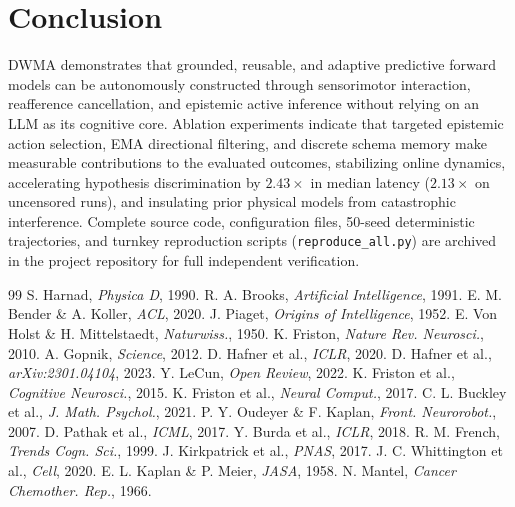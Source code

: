 \documentclass[10pt,twocolumn,a4paper]{article}
\begin{document}
\section{Conclusion}
DWMA demonstrates that grounded, reusable, and adaptive predictive forward models can be autonomously constructed through sensorimotor interaction, reafference cancellation, and epistemic active inference without relying on an LLM as its cognitive core. Ablation experiments indicate that targeted epistemic action selection, EMA directional filtering, and discrete schema memory make measurable contributions to the evaluated outcomes, stabilizing online dynamics, accelerating hypothesis discrimination by $2.43\times$ in median latency ($2.13\times$ on uncensored runs), and insulating prior physical models from catastrophic interference. Complete source code, configuration files, 50-seed deterministic trajectories, and turnkey reproduction scripts (\texttt{reproduce\_all.py}) are archived in the project repository for full independent verification.

\begin{thebibliography}{99}
\scriptsize
{} S. Harnad, \textit{Physica D}, 1990.
 R. A. Brooks, \textit{Artificial Intelligence}, 1991.
 E. M. Bender \& A. Koller, \textit{ACL}, 2020.
 J. Piaget, \textit{Origins of Intelligence}, 1952.
 E. Von Holst \& H. Mittelstaedt, \textit{Naturwiss.}, 1950.
 K. Friston, \textit{Nature Rev. Neurosci.}, 2010.
 A. Gopnik, \textit{Science}, 2012.
 D. Hafner et al., \textit{ICLR}, 2020.
 D. Hafner et al., \textit{arXiv:2301.04104}, 2023.
 Y. LeCun, \textit{Open Review}, 2022.
 K. Friston et al., \textit{Cognitive Neurosci.}, 2015.
 K. Friston et al., \textit{Neural Comput.}, 2017.
 C. L. Buckley et al., \textit{J. Math. Psychol.}, 2021.
 P. Y. Oudeyer \& F. Kaplan, \textit{Front. Neurorobot.}, 2007.
 D. Pathak et al., \textit{ICML}, 2017.
 Y. Burda et al., \textit{ICLR}, 2018.
 R. M. French, \textit{Trends Cogn. Sci.}, 1999.
 J. Kirkpatrick et al., \textit{PNAS}, 2017.
 J. C. Whittington et al., \textit{Cell}, 2020.
 E. L. Kaplan \& P. Meier, \textit{JASA}, 1958.
 N. Mantel, \textit{Cancer Chemother. Rep.}, 1966.
\end{thebibliography}
\end{document}
